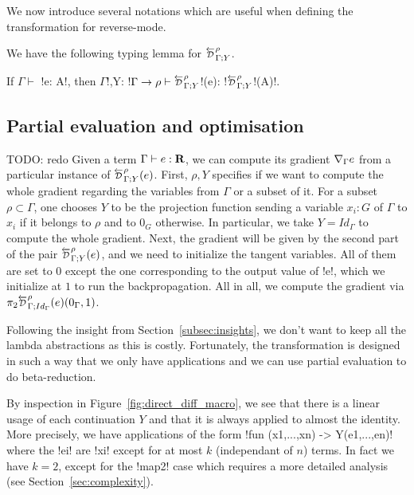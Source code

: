 We now introduce several notations which are useful when defining the transformation for reverse-mode.



We have the following typing lemma for $\directD{\rho}{\Gamma}{Y}$.
\begin{lemma}
    If $\Gamma \vdash$ !e: A!, then $\Gamma$!,Y: !$\Gamma\to \rho \vdash \directD{\rho}{\Gamma}{Y}$!(e): !$\directD{\rho}{\Gamma}{Y}$!(A)!.
\end{lemma}



\subsection{Partial evaluation and optimisation} %
\label{sub:Partial evaluation and optimisation}

TODO: redo
Given a term $\Gamma\vdash e : \mathbf{R}$, we can compute its gradient $\nabla_\Gamma e$ from a particular instance of 
$\directD{\rho}{\Gamma}{Y}(e)$. First, $\rho, Y$ specifies if we want to compute the whole gradient regarding the variables from $\Gamma$ or a subset of it.
For a subset $\rho\subset \Gamma$, one chooses $Y$ to be the projection function sending a variable 
$x_i:G$ of $\Gamma$ to $x_i$ if it belongs to $\rho$ and to $0_G$ otherwise.
In particular, we take $Y=Id_\Gamma$ to compute the whole gradient.
Next, the gradient will be given by the second part of the pair $\directD{\rho}{\Gamma}{Y}(e)$, 
and we need to initialize the tangent variables. All of them are set to $0$ except the one corresponding to the output value of !e!, 
which we initialize at $1$ to run the backpropagation. 
All in all, we compute the gradient via $\pi_2\directD{\rho}{\Gamma}{Id_\Gamma}(e)(0_\Gamma,1)$.

Following the insight from Section~\ref{subsec:insights}, 
we don't want to keep all the lambda abstractions as this is costly. 
Fortunately, the transformation is designed in such a way that we only have applications 
and we can use partial evaluation to do beta-reduction. 

By inspection in Figure~\ref{fig:direct_diff_macro}, 
we see that there is a linear usage of  each continuation $Y$ 
and that it is always applied to almost the identity. 
More precisely, we have applications of the form !fun (x1,...,xn) -> Y(e1,...,en)! 
where the !ei! are !xi! except for at most $k$ (independant of $n$) terms.
In fact we have $k=2$, except for the !map2! case which requires a more detailed analysis (see Section~\ref{sec:complexity}).

